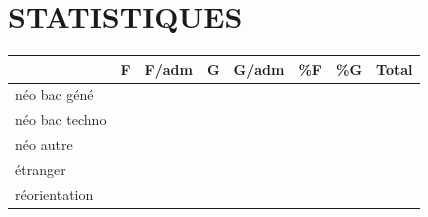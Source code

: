 \documentclass{article}%
\begin{document}
%
\section*{STATISTIQUES}%
\label{sec:STATISTIQUES}%
\begin{tabular}{|p{1.5cm}|p{1.5cm}|p{1.5cm}|p{1.5cm}|p{1.5cm}|p{1.5cm}|p{1.5cm}|p{1.5cm}|}%
\hline%
&F&F/adm&G&G/adm&\%F&\%G&Total\\%
\hline%
néo bac géné&&&&&&&\\%
\hline%
néo bac techno&&&&&&&\\%
\hline%
néo autre&&&&&&&\\%
\hline%
étranger&&&&&&&\\%
\hline%
réorientation&&&&&&&\\%
\hline%
\end{tabular}

%
\end{document}

